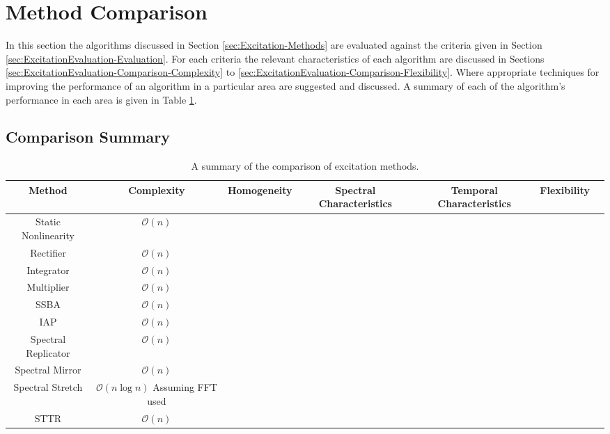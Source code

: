 \section{Method Comparison}
\label{sec:ExcitationEvaluation-Comparison}
	In this section the algorithms discussed in Section \ref{sec:Excitation-Methods} are evaluated against the criteria
	given in Section \ref{sec:ExcitationEvaluation-Evaluation}. For each criteria the relevant characteristics of each
	algorithm are discussed in Sections \ref{sec:ExcitationEvaluation-Comparison-Complexity} to
	\ref{sec:ExcitationEvaluation-Comparison-Flexibility}. Where appropriate techniques for improving the performance of
	an algorithm in a particular area are suggested and discussed. A summary of each of the algorithm's performance in
	each area is given in Table \ref{tab:ComparisonSummary}.

	\begin{landscape}
	\subsection{Comparison Summary}
	\label{sec:ExcitationEvaluation-Comparison-Summary}
		\begin{table}[h!]
			\centering
			\begin{tabular}{|c|c|c|c|c|c|c|}
				\hline
				\bf{Method} & \bf{Complexity} & \bf{Homogeneity} & \bf{Spectral Characteristics} & 
				\bf{Temporal Characteristics} & \bf{Flexibility} \tabularnewline 
				\hline
				\hline
				Static Nonlinearity & $\mathcal{O}(n)$ & & & & \tabularnewline
				\hline
				Rectifier & $\mathcal{O}(n)$ & & & & \tabularnewline
				\hline
				Integrator & $\mathcal{O}(n)$ & & & & \tabularnewline
				\hline
				Multiplier & $\mathcal{O}(n)$ & & & & \tabularnewline
				\hline
				SSBA & $\mathcal{O}(n)$ & & & & \tabularnewline
				\hline
				IAP & $\mathcal{O}(n)$ & & & & \tabularnewline
				\hline
				Spectral Replicator & $\mathcal{O}(n)$ & & & & \tabularnewline
				\hline
				Spectral Mirror & $\mathcal{O}(n)$ & & & & \tabularnewline
				\hline
				Spectral Stretch & $\mathcal{O}(n\log{n})$ Assuming FFT used & & & & \tabularnewline
				\hline
				STTR & $\mathcal{O}(n)$ & & & & \tabularnewline
				\hline
			\end{tabular}
			\caption{A summary of the comparison of excitation methods.}
			\label{tab:ComparisonSummary}
		\end{table}
	\end{landscape}

